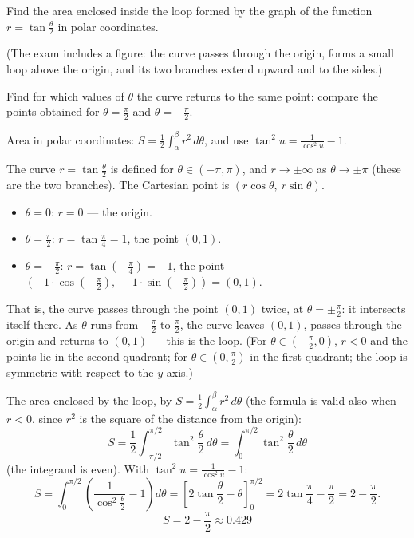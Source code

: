 
\begin{question}
Find the area enclosed inside the loop formed by the graph of the function $r=\tan\frac\theta2$ in polar coordinates.

(The exam includes a figure: the curve passes through the origin, forms a small loop above the origin, and its two branches extend upward and to the sides.)
\end{question}

\begin{hint}
Find for which values of $\theta$ the curve returns to the same point: compare the points obtained for $\theta=\frac\pi2$ and $\theta=-\frac\pi2$.
\end{hint}

\begin{hint}
Area in polar coordinates: $S=\frac12\int_\alpha^\beta r^2\,d\theta$, and use $\tan^2u=\frac1{\cos^2u}-1$.
\end{hint}

\begin{solution}
The curve $r=\tan\frac\theta2$ is defined for $\theta\in(-\pi,\pi)$, and $r\to\pm\infty$ as $\theta\to\pm\pi$ (these are the two branches). The Cartesian point is $(r\cos\theta,\ r\sin\theta)$.
\begin{itemize}
  \item $\theta=0$: $r=0$ — the origin.
  \item $\theta=\frac\pi2$: $r=\tan\frac\pi4=1$, the point $(0,1)$.
  \item $\theta=-\frac\pi2$: $r=\tan\left(-\frac\pi4\right)=-1$, the point $(-1\cdot\cos(-\frac\pi2),\,-1\cdot\sin(-\frac\pi2))=(0,1)$.
\end{itemize}
That is, the curve passes through the point $(0,1)$ twice, at $\theta=\pm\frac\pi2$: it intersects itself there. As $\theta$ runs from $-\frac\pi2$ to $\frac\pi2$, the curve leaves $(0,1)$, passes through the origin and returns to $(0,1)$ — this is the loop. (For $\theta\in(-\frac\pi2,0)$, $r<0$ and the points lie in the second quadrant; for $\theta\in(0,\frac\pi2)$ in the first quadrant; the loop is symmetric with respect to the $y$-axis.)

The area enclosed by the loop, by $S=\frac12\int_\alpha^\beta r^2\,d\theta$ (the formula is valid also when $r<0$, since $r^2$ is the square of the distance from the origin):
\[ S=\frac12\int_{-\pi/2}^{\pi/2}\tan^2\frac\theta2\,d\theta=\int_0^{\pi/2}\tan^2\frac\theta2\,d\theta \]
(the integrand is even). With $\tan^2u=\frac1{\cos^2u}-1$:
\[ S=\int_0^{\pi/2}\left(\frac{1}{\cos^2\frac\theta2}-1\right)d\theta=\left[2\tan\frac\theta2-\theta\right]_0^{\pi/2}=2\tan\frac\pi4-\frac\pi2=2-\frac\pi2. \]
\[ \boxed{S=2-\frac\pi2\approx0.429} \]
\end{solution}
